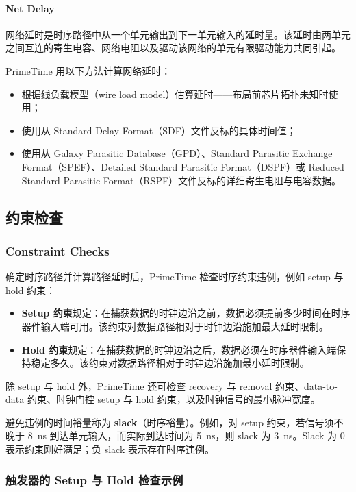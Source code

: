 \paragraph*{Net Delay}

网络延时是时序路径中从一个单元输出到下一单元输入的延时量。该延时由两单元之间互连的寄生电容、网络电阻以及驱动该网络的单元有限驱动能力共同引起。

PrimeTime 用以下方法计算网络延时：
\begin{itemize}
  \item 根据线负载模型（wire load model）估算延时——布局前芯片拓扑未知时使用；
  \item 使用从 Standard Delay Format（SDF）文件反标的具体时间值；
  \item 使用从 Galaxy Parasitic Database（GPD）、Standard Parasitic Exchange Format（SPEF）、Detailed Standard Parasitic Format（DSPF）或 Reduced Standard Parasitic Format（RSPF）文件反标的详细寄生电阻与电容数据。
\end{itemize}

\subsection{约束检查}
\subsubsection*{Constraint Checks}

确定时序路径并计算路径延时后，PrimeTime 检查时序约束违例，例如 setup 与 hold 约束：
\begin{itemize}
  \item \textbf{Setup 约束}规定：在捕获数据的时钟边沿之前，数据必须提前多少时间在时序器件输入端可用。该约束对数据路径相对于时钟边沿施加最大延时限制。
  \item \textbf{Hold 约束}规定：在捕获数据的时钟边沿之后，数据必须在时序器件输入端保持稳定多久。该约束对数据路径相对于时钟边沿施加最小延时限制。
\end{itemize}

除 setup 与 hold 外，PrimeTime 还可检查 recovery 与 removal 约束、data-to-data 约束、时钟门控 setup 与 hold 约束，以及时钟信号的最小脉冲宽度。

避免违例的时间裕量称为 \textbf{slack}（时序裕量）。例如，对 setup 约束，若信号须不晚于 8~ns 到达单元输入，而实际到达时间为 5~ns，则 slack 为 3~ns。Slack 为 0 表示约束刚好满足；负 slack 表示存在时序违例。

\subsubsection{触发器的 Setup 与 Hold 检查示例}
